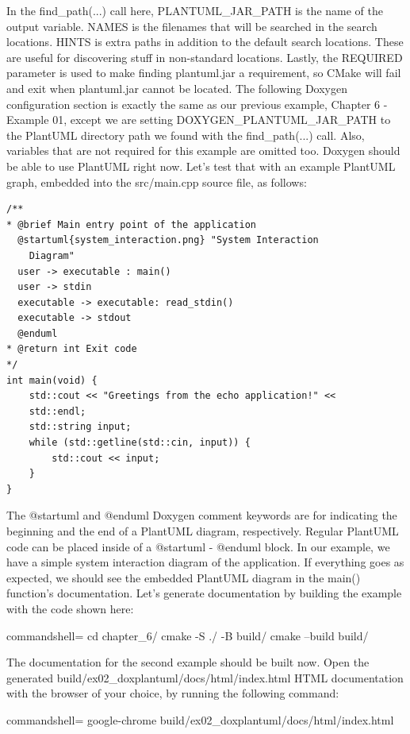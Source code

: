 In the find\_path(...) call here, PLANTUML\_JAR\_PATH is the name of the output variable. NAMES is the filenames that will be searched in the search locations. HINTS is extra paths in addition to the default search locations. These are useful for discovering stuff in non-standard locations. Lastly, the REQUIRED parameter is used to make finding plantuml.jar a requirement, so CMake will fail and exit when plantuml.jar cannot be located. The following Doxygen configuration section is exactly the same as our previous example, Chapter 6 - Example 01, except we are setting DOXYGEN\_PLANTUML\_JAR\_PATH to the PlantUML directory path we found with the find\_path(...) call. Also, variables that are not required for this example are omitted too. Doxygen should be able to use PlantUML right now. Let's test that with an example PlantUML graph, embedded into the src/main.cpp source file, as follows:

\begin{lstlisting}[style=styleCXX]
/**
* @brief Main entry point of the application
  @startuml{system_interaction.png} "System Interaction
    Diagram"
  user -> executable : main()
  user -> stdin
  executable -> executable: read_stdin()
  executable -> stdout
  @enduml
* @return int Exit code
*/
int main(void) {
	std::cout << "Greetings from the echo application!" <<
	std::endl;
	std::string input;
	while (std::getline(std::cin, input)) {
		std::cout << input;
	}
}
\end{lstlisting}

The @startuml and @enduml Doxygen comment keywords are for indicating the beginning and the end of a PlantUML diagram, respectively. Regular PlantUML code can be placed inside of a @startuml - @enduml block. In our example, we have a simple system interaction diagram of the application. If everything goes as expected, we should see the embedded PlantUML diagram in the main() function's documentation. Let's generate documentation by building the example with the code shown here:
 
\begin{tcblisting}{commandshell={}}
cd chapter_6/
cmake -S ./ -B build/
cmake --build build/
\end{tcblisting}

The documentation for the second example should be built now. Open the generated build/ex02\_doxplantuml/docs/html/index.html HTML documentation with the browser of your choice, by running the following command:

\begin{tcblisting}{commandshell={}}
google-chrome build/ex02_doxplantuml/docs/html/index.html
\end{tcblisting}

